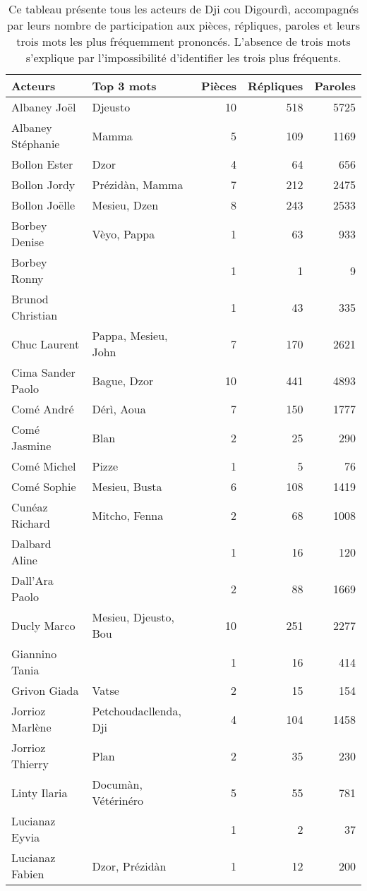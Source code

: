 \begin{longtable}{llrrr}
\caption{\small Ce tableau présente tous les acteurs de Dji cou Digourdì, accompagnés par leurs nombre de participation aux pièces, répliques, paroles et leurs trois mots les plus fréquemment prononcés. L'absence de trois mots s'explique par l'impossibilité d'identifier les trois plus fréquents.}\\
\toprule
\textbf{Acteurs} & \textbf{Top 3 mots} & \textbf{Pièces} & \textbf{Répliques} & \textbf{Paroles} \\
    \midrule
Albaney Joël &Djeusto & 10 & 518 & 5725\\
Albaney Stéphanie &Mamma & 5 & 109 & 1169\\
Bollon Ester &Dzor & 4 & 64 & 656\\
Bollon Jordy &Prézidàn, Mamma & 7 & 212 & 2475\\
Bollon Joëlle &Mesieu, Dzen & 8 & 243 & 2533\\
Borbey Denise &Vèyo, Pappa & 1 & 63 & 933\\
Borbey Ronny & & 1 & 1 & 9\\
Brunod Christian & & 1 & 43 & 335\\
Chuc Laurent &Pappa, Mesieu, John & 7 & 170 & 2621\\
Cima Sander Paolo &Bague, Dzor & 10 & 441 & 4893\\
Comé André &Dérì, Aoua & 7 & 150 & 1777\\
Comé Jasmine &Blan & 2 & 25 & 290\\
Comé Michel &Pizze & 1 & 5 & 76\\
Comé Sophie &Mesieu, Busta & 6 & 108 & 1419\\
Cunéaz Richard &Mitcho, Fenna & 2 & 68 & 1008\\
Dalbard Aline & & 1 & 16 & 120\\
Dall'Ara Paolo & & 2 & 88 & 1669\\
Ducly Marco &Mesieu, Djeusto, Bou & 10 & 251 & 2277\\
Giannino Tania & & 1 & 16 & 414\\
Grivon Giada &Vatse & 2 & 15 & 154\\
Jorrioz Marlène &Petchoudacllenda, Dji & 4 & 104 & 1458\\
Jorrioz Thierry &Plan & 2 & 35 & 230\\
Linty Ilaria &Documàn, Vétérinéro & 5 & 55 & 781\\
Lucianaz Eyvia & & 1 & 2 & 37\\
Lucianaz Fabien &Dzor, Prézidàn & 1 & 12 & 200\\

\end{longtable}
